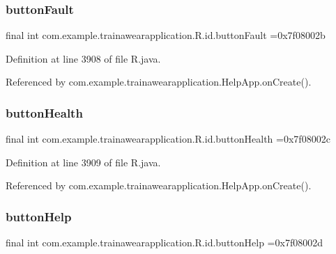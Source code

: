 \subsubsection{\texorpdfstring{buttonFault}{buttonFault}}
{\footnotesize\ttfamily final int com.\+example.\+trainawearapplication.\+R.\+id.\+button\+Fault =0x7f08002b\hspace{0.3cm}{\ttfamily [static]}}



Definition at line 3908 of file R.\+java.



Referenced by com.\+example.\+trainawearapplication.\+Help\+App.\+on\+Create().

\mbox{\label{classcom_1_1example_1_1trainawearapplication_1_1_r_1_1id_aee1ade8a096bb94ddaa260e94ff83983}} 
\subsubsection{\texorpdfstring{buttonHealth}{buttonHealth}}
{\footnotesize\ttfamily final int com.\+example.\+trainawearapplication.\+R.\+id.\+button\+Health =0x7f08002c\hspace{0.3cm}{\ttfamily [static]}}



Definition at line 3909 of file R.\+java.



Referenced by com.\+example.\+trainawearapplication.\+Help\+App.\+on\+Create().

\mbox{\label{classcom_1_1example_1_1trainawearapplication_1_1_r_1_1id_ac19404c64cdc6e2310d8873930fa2794}} 
\subsubsection{\texorpdfstring{buttonHelp}{buttonHelp}}
{\footnotesize\ttfamily final int com.\+example.\+trainawearapplication.\+R.\+id.\+button\+Help =0x7f08002d\hspace{0.3cm}{\ttfamily [static]}}




